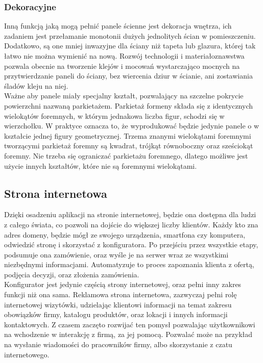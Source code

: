 \documentclass{article} %
\begin{document}
        \subsubsection{Dekoracyjne}
        Inną funkcją jaką mogą pełnić panele ścienne jest dekoracja wnętrza, ich zadaniem jest przełamanie monotonii dużych jednolitych ścian w pomieszczeniu. Dodatkowo, są one mniej inwazyjne dla ściany niż tapeta lub glazura, której tak łatwo nie można wymienić na nową. Rozwój technologii i materiałoznawstwa pozwala obecnie na tworzenie klejów i mocowań wystarczająco mocnych na przytwierdzanie paneli do ściany, bez wiercenia dziur w ścianie, ani zostawiania śladów kleju na niej.
        \\
        
        Ważne aby panele miały specjalny kształt, pozwalający na szczelne pokrycie powierzchni nazwaną parkietażem. Parkietaż formeny składa się z identycznych wielokątów foremnych, w którym jednakowa liczba figur, schodzi się w wierzchołku. W praktyce oznacza to, że wyprodukować będzie jedynie panele o w kształcie jednej figury geometrycznej. Trzema znanymi wielokątami foremnymi tworzącymi parkietaż foremny są kwadrat, trójkąt równoboczny oraz sześciokąt foremny. Nie trzeba się ograniczać parkietażu foremnego, dlatego możliwe jest użycie innych kształtów, które nie są foremnymi wielokątami.
        \\
    
    \subsection{Strona internetowa}
        Dzięki osadzeniu aplikacji na stronie internetowej, będzie ona dostępna dla ludzi z całego świata, co pozwoli na dojście do większej liczby klientów. Każdy kto zna adres domeny, będzie mógł ze swojego urządzenia, smartfona czy komputera, odwiedzić stronę i skorzystać z konfiguratora. Po przejściu przez wszystkie etapy, podsumuje ona zamówienie, oraz wyśle je na serwer wraz ze wszystkimi niezbędnymi informacjami. Automatyzuje to proces zapoznania klienta z ofertą, podjęcia decyzji, oraz złożenia zamówienia.
        \\
        
        Konfigurator jest jedynie częścią strony internetowej, oraz pełni inny zakres funkcji niż ona sama. Reklamowa strona internetowa, zazwyczaj pełni rolę internetowej wizytówki, udzielając klientowi informacji na temat zakresu obowiązków firmy, katalogu produktów, oraz lokacji i innych informacji kontaktowych. Z czasem zaczęto rozwijać ten pomysł pozwalając użytkownikowi na wchodzenie w interakcję z firmą, za jej pomocą. Pozwalać może na przykład na wysłanie wiadomości do pracowników firmy, albo skorzystanie z czatu internetowego.
        \\
        
\end{document}
